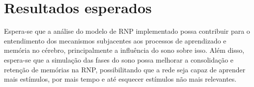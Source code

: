 \section{Resultados esperados}

Espera-se que a análise do modelo de RNP implementado possa contribuir para o entendimento dos mecanismos subjacentes aos
processos de aprendizado e memória no cérebro, principalmente a influência do sono sobre isso. Além disso, espera-se que a
simulação das fases do sono possa melhorar a consolidação e retenção de memórias na RNP, possibilitando que a rede seja capaz de
aprender mais estímulos, por mais tempo e até esquecer estímulos não mais relevantes.
